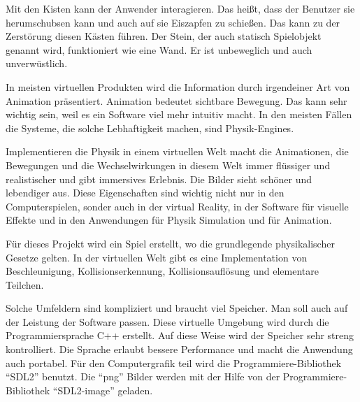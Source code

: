 \documentclass[
  10pt,
  a4paper,
  oneside,
  headers,
  headinclude,
  footinclude,
  BCOR5mm,
]{article}
\begin{document}
\justify
Mit den Kisten kann der Anwender interagieren. Das heißt, dass der Benutzer sie herumschubsen kann und auch auf sie Eiszapfen zu schießen. Das kann zu der Zerstörung diesen Kästen führen. Der Stein, der auch statisch Spielobjekt genannt wird, funktioniert wie eine Wand. Er ist unbeweglich und auch unverwüstlich.

In meisten virtuellen Produkten wird die Information durch irgendeiner Art von Animation präsentiert. Animation bedeutet sichtbare Bewegung. Das kann sehr wichtig sein, weil es ein Software viel mehr intuitiv macht. In den meisten Fällen die Systeme, die solche Lebhaftigkeit machen, sind Physik-Engines.

Implementieren die Physik in einem virtuellen Welt macht die Animationen, die Bewegungen und die Wechselwirkungen in diesem Welt immer flüssiger und realistischer und gibt immersives Erlebnis. Die Bilder sieht schöner und lebendiger aus. Diese Eigenschaften sind wichtig nicht nur in den Computerspielen, sonder auch in der virtual Reality, in der Software für visuelle Effekte und in den Anwendungen für Physik Simulation und für Animation.

Für dieses Projekt wird ein Spiel erstellt, wo die grundlegende physikalischer Gesetze gelten. In der virtuellen Welt gibt es eine Implementation von Beschleunigung, Kollisionserkennung, Kollisionsauflösung und elementare Teilchen.

Solche Umfeldern sind kompliziert und braucht viel Speicher. Man soll auch auf der Leistung der Software passen. Diese virtuelle Umgebung wird durch die Programmiersprache C++ erstellt. Auf diese Weise wird der Speicher sehr streng kontrolliert. Die Sprache erlaubt bessere Performance und macht die Anwendung auch portabel. Für den Computergrafik teil wird die Programmiere-Bibliothek ``SDL2'' benutzt. Die ``png'' Bilder werden mit der Hilfe von der Programmiere-Bibliothek ``SDL2-image'' geladen.

\newpage
\end{document}
